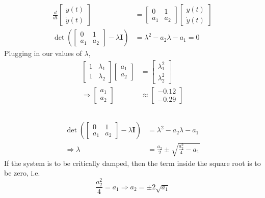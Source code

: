 \documentclass[]{article}
\newcommand{\diff}[1]{\frac{d}{d #1}}
\begin{document}
\subsection{}

\begin{align}
	\diff{t} \begin{bmatrix}
	y(t) \\
	\dot{y}(t)
	\end{bmatrix} &=
	\begin{bmatrix}
	0 & 1 \\
	a_1 & a_2
	\end{bmatrix}
	\begin{bmatrix}
	y(t) \\
	\dot{y}(t)
	\end{bmatrix} \\
	\det\left(\begin{bmatrix}
	0 & 1 \\
	a_1 & a_2
	\end{bmatrix} - \lambda \bm{I}\right) &= \lambda^2 - a_2 \lambda - a_1 = 0
\end{align}
Plugging in our values of \(\lambda\),
\begin{align}
	\begin{bmatrix}
	1 & \lambda_1 \\
	1 & \lambda_2
	\end{bmatrix}
	\begin{bmatrix}
	a_1 \\
	a_2
	\end{bmatrix} &=
	\begin{bmatrix}
	\lambda_1^2 \\
	\lambda_2^2
	\end{bmatrix} \\
	\Rightarrow \begin{bmatrix}
	a_1 \\
	a_2
	\end{bmatrix} &\approx
	\begin{bmatrix}
	-0.12 \\
	-0.29
	\end{bmatrix}
\end{align}

\subsection{}

\begin{align}
	\det\left(\begin{bmatrix}
	0 & 1 \\
	a_1 & a_2
	\end{bmatrix} - \lambda \bm{I}\right) &= \lambda^2 - a_2 \lambda - a_1 \\
	\Rightarrow \lambda &= \frac{a_2}{2} \pm \sqrt{\frac{a_2^2}{4} - a_1}
\end{align}
If the system is to be critically damped, then the term inside the square root is to be zero, i.e.
\begin{equation}
	\frac{a_2^2}{4} = a_1 \Longrightarrow a_2 = \pm 2 \sqrt{a_1}
\end{equation}
\end{document}
